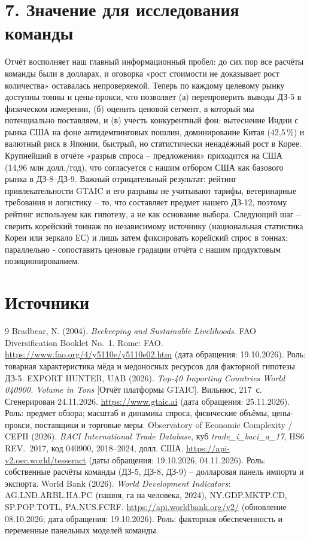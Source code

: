 \documentclass[11pt,a4paper]{article}
\begin{document}
\section*{7. Значение для исследования команды}

Отчёт восполняет наш главный информационный пробел: до сих пор все расчёты команды были
в долларах, и оговорка «рост стоимости не доказывает рост количества» оставалась
непроверяемой. Теперь по каждому целевому рынку доступны тонны и цены-прокси, что позволяет
(а) перепроверить выводы ДЗ-5 в физическом измерении, (б) оценить ценовой сегмент, в который
мы потенциально поставляем, и (в) учесть конкурентный фон: вытеснение Индии с рынка США
на фоне антидемпинговых пошлин, доминирование Китая (42{,}5\,\%) и валютный риск в Японии,
быстрый, но статистически ненадёжный рост в Корее. Крупнейший в отчёте «разрыв спроса --
предложения» приходится на США (14{,}96 млн долл./год), что согласуется с нашим отбором США
как базового рынка в ДЗ-8--ДЗ-9. Важный отрицательный результат: рейтинг привлекательности
GTAIC и его разрывы не учитывают тарифы, ветеринарные требования и логистику -- то, что
составляет предмет нашего ДЗ-12, поэтому рейтинг используем как гипотезу, а не как основание
выбора. Следующий шаг -- сверить корейский тоннаж по независимому источнику (национальная
статистика Кореи или зеркало ЕС) и лишь затем фиксировать корейский спрос в тоннах; параллельно
- сопоставить ценовые градации отчёта с нашим продуктовым позиционированием.

\section*{Источники}
\begin{thebibliography}{9}
 Bradbear, N. (2004). \textit{Beekeeping and Sustainable Livelihoods}.
FAO Diversification Booklet No.~1. Rome: FAO.
\url{https://www.fao.org/4/y5110e/y5110e02.htm} (дата обращения: 19.10.2026).
Роль: товарная характеристика мёда и медоносных ресурсов для факторной гипотезы ДЗ-5.
 EXPORT HUNTER, UAB (2026). \textit{Top-40 Importing Countries World
040900. Volume in Tons} [Отчёт платформы GTAIC]. Вильнюс, 217~с. Сгенерирован 24.11.2026.
\url{https://www.gtaic.ai} (дата обращения: 25.11.2026).
Роль: предмет обзора; масштаб и динамика спроса, физические объёмы, цены-прокси, поставщики
и торговые меры.
 Observatory of Economic Complexity / CEPII (2026). \textit{BACI International
Trade Database}, куб \textit{trade\_i\_baci\_a\_17}, HS6 REV.~2017, код 040900, 2018--2024,
долл. США. \url{https://api-v2.oec.world/tesseract} (даты обращения: 19.10.2026, 04.11.2026).
Роль: собственные расчёты команды (ДЗ-5, ДЗ-8, ДЗ-9) -- долларовая панель импорта и экспорта.
 World Bank (2026). \textit{World Development Indicators}: AG.LND.ARBL.HA.PC
(пашня, га на человека, 2024), NY.GDP.MKTP.CD, SP.POP.TOTL, PA.NUS.FCRF.
\url{https://api.worldbank.org/v2/} (обновление 08.10.2026; дата обращения: 19.10.2026).
Роль: факторная обеспеченность и переменные панельных моделей команды.
\end{thebibliography}
\end{document}
